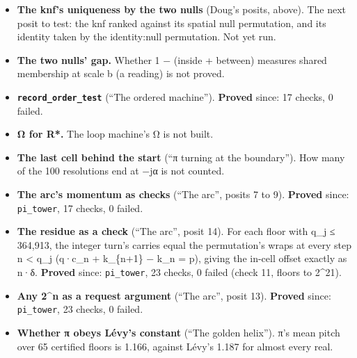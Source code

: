 \begin{itemize}
\item \textbf{The knf's uniqueness by the two nulls} (Doug's posits, above). The next posit to test: the knf ranked against its spatial null permutation, and its identity taken by the identity:null permutation. Not yet run.
\item \textbf{The two nulls' gap.} Whether 1 − (inside + between) measures shared membership at scale b (a reading) is not proved.
\item \textbf{\texttt{record\_\allowbreak{}order\_\allowbreak{}test}} (“The ordered machine”). \textbf{Proved} since: 17 checks, 0 failed.
\item \textbf{Ω for R*.} The loop machine's Ω is not built.
\item \textbf{The last cell behind the start} (“π turning at the boundary”). How many of the 100 resolutions end at −jα is not counted.
\item \textbf{The arc's momentum as checks} (“The arc”, posits 7 to 9). \textbf{Proved} since: \texttt{pi\_\allowbreak{}tower}, 17 checks, 0 failed.
\item \textbf{The residue as a check} (“The arc”, posit 14). For each floor with q\_\allowbreak{}j ≤ 364,913, the integer turn's carries equal the permutation's wraps at every step n < q\_\allowbreak{}j (q·c\_\allowbreak{}n + k\_\allowbreak{}\{n+1\} − k\_\allowbreak{}n = p), giving the in-cell offset exactly as n·δ. \textbf{Proved} since: \texttt{pi\_\allowbreak{}tower}, 23 checks, 0 failed (check 11, floors to 2\textasciicircum{}21).
\item \textbf{Any 2\textasciicircum{}n as a request argument} (“The arc”, posit 13). \textbf{Proved} since: \texttt{pi\_\allowbreak{}tower}, 23 checks, 0 failed.
\item \textbf{Whether π obeys Lévy's constant} (“The golden helix”). π's mean pitch over 65 certified floors is 1.166, against Lévy's 1.187 for almost every real.

\end{itemize}
